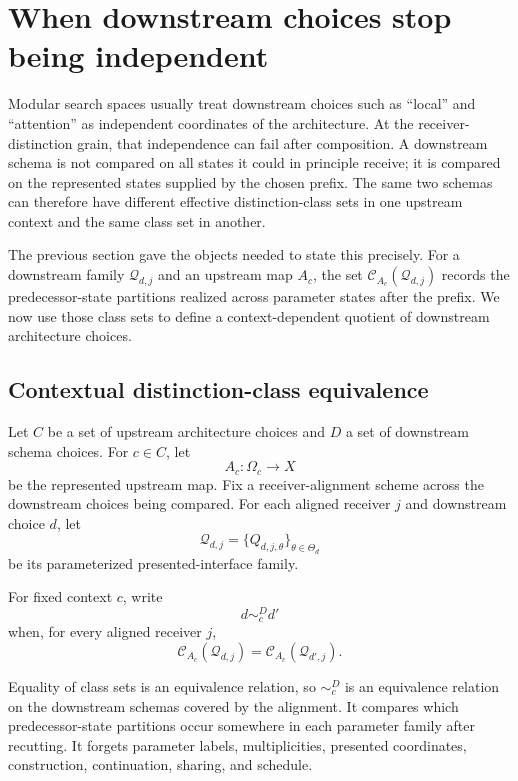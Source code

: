 \section{When downstream choices stop being independent}\label{sec:contextual-search}

Modular search spaces usually treat downstream choices such as ``local'' and ``attention'' as independent coordinates of the architecture. At the receiver-distinction grain, that independence can fail after composition. A downstream schema is not compared on all states it could in principle receive; it is compared on the represented states supplied by the chosen prefix. The same two schemas can therefore have different effective distinction-class sets in one upstream context and the same class set in another.

The previous section gave the objects needed to state this precisely. For a downstream family $\mathcal Q_{d,j}$ and an upstream map $A_c$, the set $\mathcal C_{A_c}(\mathcal Q_{d,j})$ records the predecessor-state partitions realized across parameter states after the prefix. We now use those class sets to define a context-dependent quotient of downstream architecture choices.

\subsection{Contextual distinction-class equivalence}

Let $C$ be a set of upstream architecture choices and $D$ a set of downstream schema choices. For $c\in C$, let
\[
A_c:\Omega_c\to X
\]
be the represented upstream map. Fix a receiver-alignment scheme across the downstream choices being compared. For each aligned receiver $j$ and downstream choice $d$, let
\[
\mathcal Q_{d,j}=\{Q_{d,j,\theta}\}_{\theta\in\Theta_d}
\]
be its parameterized presented-interface family.

\begin{definition}\label{def:contextual-class-equivalence-v13}
For fixed context $c$, write
\[
d\sim_c^D d'
\]
when, for every aligned receiver $j$,
\[
\boxed{
\mathcal C_{A_c}(\mathcal Q_{d,j})
=
\mathcal C_{A_c}(\mathcal Q_{d',j}).
}
\]
\end{definition}

Equality of class sets is an equivalence relation, so $\sim_c^D$ is an equivalence relation on the downstream schemas covered by the alignment. It compares which predecessor-state partitions occur somewhere in each parameter family after recutting. It forgets parameter labels, multiplicities, presented coordinates, construction, continuation, sharing, and schedule.


